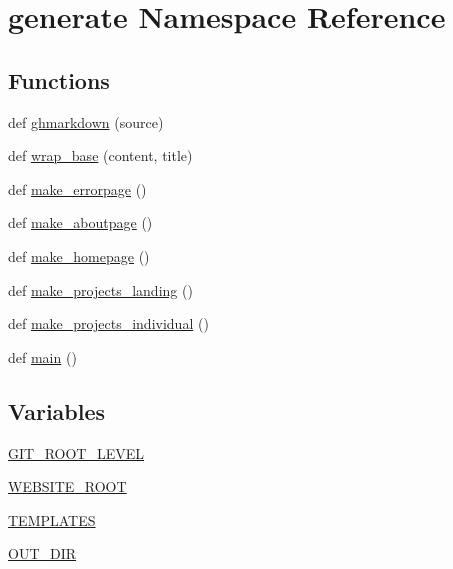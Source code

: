 \hypertarget{namespacegenerate}{}\section{generate Namespace Reference}
\label{namespacegenerate}
\subsection*{Functions}
\begin{DoxyCompactItemize}
\item 
def \hyperlink{namespacegenerate_a7811fd26fa2e3aeec0e3d3851cdda546}{ghmarkdown} (source)
\item 
def \hyperlink{namespacegenerate_adb990cdb948e21150b35af85d236b6be}{wrap\+\_\+base} (content, title)
\item 
def \hyperlink{namespacegenerate_a1c52bc54613c3a13c908bc65d7911b8e}{make\+\_\+errorpage} ()
\item 
def \hyperlink{namespacegenerate_afa732feea0def89a5b9d1a2a6549ee60}{make\+\_\+aboutpage} ()
\item 
def \hyperlink{namespacegenerate_acffbc7c203626a1f396da4a96a2d448d}{make\+\_\+homepage} ()
\item 
def \hyperlink{namespacegenerate_a33f954414406a12534e313700841053e}{make\+\_\+projects\+\_\+landing} ()
\item 
def \hyperlink{namespacegenerate_a7e834fd25099e451f5809b35df4ef10d}{make\+\_\+projects\+\_\+individual} ()
\item 
def \hyperlink{namespacegenerate_a7f0253880883fcd9badd715587a15668}{main} ()
\end{DoxyCompactItemize}
\subsection*{Variables}
\begin{DoxyCompactItemize}
\item 
\hyperlink{namespacegenerate_afea39d363835652697e0616074816686}{G\+I\+T\+\_\+\+R\+O\+O\+T\+\_\+\+L\+E\+V\+EL}
\item 
\hyperlink{namespacegenerate_a3cb5a2707122c53bf81da4c33e3f65c4}{W\+E\+B\+S\+I\+T\+E\+\_\+\+R\+O\+OT}
\item 
\hyperlink{namespacegenerate_ae98641ac5f9b63366f1c9b644d0a7548}{T\+E\+M\+P\+L\+A\+T\+ES}
\item 
\hyperlink{namespacegenerate_a6883b4bdece5baaaaf8a166563dd789e}{O\+U\+T\+\_\+\+D\+IR}
\end{DoxyCompactItemize}


